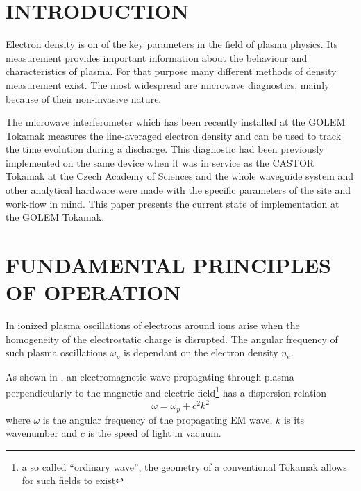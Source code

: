 \documentclass[a4paper,twoside]{articlek}
\begin{document}
\sloppy
{}
\section{INTRODUCTION}
Electron density is on of the key parameters in the field of plasma physics. Its measurement provides important information about the behaviour and characteristics of plasma. For that purpose many different methods of density measurement exist.
The most widespread are microwave diagnostics, mainly because of their non-invasive nature. 

The microwave interferometer which has been recently installed at the GOLEM Tokamak measures the line-averaged electron density and can be used to track the time evolution during a discharge.
This diagnostic had been previously implemented on the same device when it was in service as the CASTOR Tokamak 
at the Czech Academy of Sciences and the whole waveguide system and other analytical hardware were made with the specific parameters of the site and work-flow in mind. This paper presents the current state of implementation at the GOLEM Tokamak.

\section{FUNDAMENTAL PRINCIPLES OF OPERATION} 

In ionized plasma oscillations of electrons around ions arise when the homogeneity of the electrostatic charge is disrupted. The angular frequency of such plasma oscillations $\omega_p$ is dependant on the electron density $n_e$. 

As shown in \cite{mateju}, an electromagnetic wave propagating through plasma perpendicularly to the magnetic and electric field\footnote{a so called ``ordinary wave'', the geometry of a conventional Tokamak allows for such fields to exist} has a dispersion relation
\begin{equation}
    \omega = \omega_p +c^2 k^2
    \label{eq:dispersion}
\end{equation}
where $\omega$ is the angular frequency of the propagating EM wave, $k$ is its wavenumber and $c$ is the speed of light in vacuum.
\end{document}
